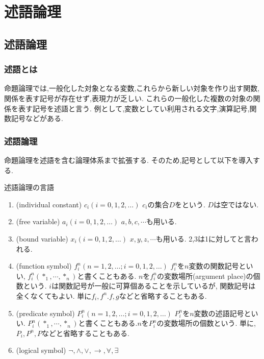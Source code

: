 \chapter{述語論理}
\section{述語論理}

\subsection{述語とは}
命題論理では,一般化した対象となる変数,これらから新しい対象を作り出す関数,
関係を表す記号が存在せず,表現力が乏しい.
これらの一般化した複数の対象の関係を表す記号を述語と言う.
例として,変数としてい利用される文字,演算記号,関数記号などがある.

\subsection{述語論理}
命題論理を述語を含む論理体系まで拡張する. そのため,記号として以下を導入する.
\begin{dfn}
 \label{pred_L}
述語論理の言語
\begin{enumerate}
 \item {}(individual constant) $c_i(i=0,1,2,\dots)$ $c_i$の集合$D$をという. $D$は空ではない.
 \item {}(free variable) $a_i(i=0,1,2,\dots)$ $a,b,c,\cdots$も用いる.
 \item {}(bound variable) $x_i(i=0,1,2,\dots)$ $x,y,z,\cdots$も用いる.
	   2,3は1に対してと言われる.
 \item {}(function symbol) $f_i^n(n=1,2,\dots;i=0,1,2,\dots)$
	   $f_i^n$を$n$変数の関数記号といい, $f_i^n(*_1,\cdots,*_n)$と書くこともある.
	   $n$を$f_i^n$の変数場所(argument place)の個数という.
	   $i$は関数記号が一般に可算個あることを示しているが, 関数記号は全くなくてもよい.
	   単に$f_i,f^n.f,g$などと省略することもある.
 \item {}(predicate symbol) $P_i^n(n=1,2,\dots;i=0,1,2,\dots)$ $P_i^n$を$n$変数の述語記号といい.
	   $P_i^n(*_1,\cdots,*_n)$と書くこともある.$n$を$P_i^n$の変数場所の個数という.
	   単に,$P_i,P^n,P$などと省略することもある.
 \item {}(logical symbol) $\lnot,\land,\lor,\to,\forall,\exists$
\end{enumerate}
\end{dfn}

